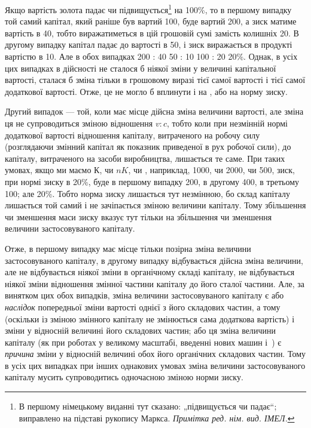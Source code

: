\parcont{}  %
Якщо вартість золота падає чи підвищується\footnote*{
В першому німецькому виданні тут сказано: „підвищується чи падає“;
виправлено на підставі рукопису Маркса. \emph{Примітка ред. нім. вид. ІМЕЛ.}
} на 100\%, то
в першому випадку той самий капітал, який раніше був вартий
100, буде вартий 200, а зиск
матиме вартість в 40, тобто виражатиметься
в цій грошовій сумі замість колишніх 20.
В другому випадку капітал падає до вартості в 50, і зиск виражається в продукті вартістю в 10. Але в обох випадках 200 : 40 \deq{} 50 : 10 \deq{} 100 : 20 \deq{} 20\%.
Однак, в усіх цих випадках в дійсності не сталося б ніякої
зміни у величині капітальної вартості, сталася б зміна тільки
в грошовому виразі тієї самої вартості і тієї самої додаткової
вартості. Отже, це не могло б вплинути і на , або на норму
зиску.

Другий випадок — той, коли має місце дійсна зміна величини
вартості, але зміна ця не супроводиться зміною відношення
$v : c$, тобто коли при незмінній нормі додаткової вартості відношення
капіталу, витраченого на робочу силу (розглядаючи
змінний капітал як показник приведеної в рух робочої сили), до
капіталу, витраченого на засоби виробництва, лишається те
саме. При таких умовах, якщо ми маємо $К$, чи $nK$, чи , наприклад,
1000, чи 2000, чи 500, зиск, при нормі зиску в 20\%,
буде в першому випадку \deq{} 200, в другому \deq{} 400, в третьому \deq{} 100;
але  \deq{}  \deq{}  \deq{} 20\%. Тобто норма зиску лишається тут
незмінною, бо склад капіталу лишається той самий і не зачіпається
зміною величини капіталу. Тому збільшення чи зменшення
маси зиску вказує тут тільки на збільшення чи зменшення
величини застосовуваного капіталу.

Отже, в першому випадку має місце тільки позірна зміна
величини застосовуваного капіталу, в другому випадку відбувається
дійсна зміна величини, але не відбувається ніякої зміни
в органічному складі капіталу, не відбувається ніякої зміни
відношення змінної частини капіталу до його сталої частини.
Але, за винятком цих обох випадків, зміна величини застосовуваного
капіталу є або \emph{наслідок} попередньої зміни вартості
однієї з його складових частин, а тому (оскільки із зміною змінного
капіталу не змінюється сама додаткова вартість) і зміни
у відносній величині його складових частин; або ця зміна величини
капіталу (як при роботах у великому масштабі, введенні нових
машин і~) є \emph{причина} зміни у відносній величині обох його
органічних складових частин. Тому в усіх цих випадках при
інших однакових умовах зміна величини застосовуваного капіталу
мусить супроводитись одночасною зміною норми зиску.
